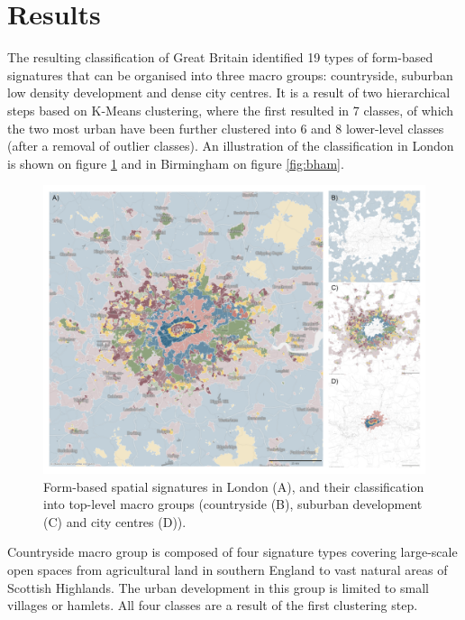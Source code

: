 \section{Results}
\label{sec:res}

The resulting classification of Great Britain identified 19 types of form-based
signatures that can be organised into three macro groups: countryside, suburban low
density development and dense city centres. It is a result of two hierarchical steps
based on K-Means clustering, where the first resulted in 7 classes, of which the two
most urban have been further clustered into 6 and 8 lower-level classes (after a removal
of outlier classes). An illustration of the classification in London is shown on figure
\ref{fig:london} and in Birmingham on figure \ref{fig:bham}.

\begin{figure}
    \includegraphics[width=0.75\linewidth, center]{fig/london.png}
    \caption{Form-based spatial signatures in London (A), and their classification into
    top-level macro groups (countryside (B), suburban development (C) and city centres
    (D)).}
    \label{fig:london}
\end{figure}

Countryside macro group is composed of four signature types covering large-scale open
spaces from agricultural land in southern England to vast natural areas of Scottish
Highlands. The urban development in this group is limited to small villages or hamlets.
All four classes are a result of the first clustering step.

